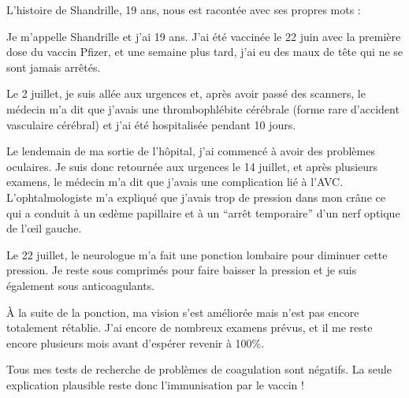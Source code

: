 L'histoire de Shandrille, 19 ans, nous est racontée avec ses propres mots :

Je m'appelle Shandrille et j'ai 19 ans. J'ai été vaccinée le 22 juin avec la
première dose du vaccin Pfizer, et une semaine plus tard, j'ai eu des maux de
tête qui ne se sont jamais arrêtés.

Le 2 juillet, je suis allée aux urgences et, après avoir passé des scanners, le
médecin m'a dit que j'avais une thrombophlébite cérébrale (forme rare d'accident
vasculaire cérébral) et j'ai été hospitalisée pendant 10 jours.

Le lendemain de ma sortie de l'hôpital, j'ai commencé à avoir des problèmes
oculaires. Je suis donc retournée aux urgences le 14 juillet, et après plusieurs
examens, le médecin m'a dit que j'avais une complication lié à
l'AVC. L'ophtalmologiste m'a expliqué que j'avais trop de pression dans mon
crâne ce qui a conduit à un œdème papillaire et à un “arrêt temporaire” d'un
nerf optique de l'œil gauche.

Le 22 juillet, le neurologue m'a fait une ponction lombaire pour diminuer cette
pression. Je reste sous comprimés pour faire baisser la pression et je suis
également sous anticoagulants.

À la suite de la ponction, ma vision s'est améliorée mais n'est pas encore
totalement rétablie. J'ai encore de nombreux examens prévus, et il me reste
encore plusieurs mois avant d'espérer revenir à 100\%.

Tous mes tests de recherche de problèmes de coagulation sont négatifs. La seule
explication plausible reste donc l'immunisation par le vaccin !

